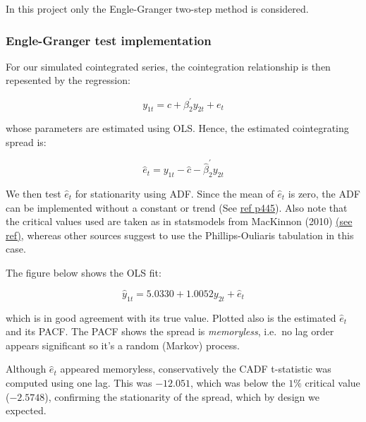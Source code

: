 \documentclass{article}
\begin{document}
In this project only the Engle-Granger two-step method is considered.

    \subsubsection{Engle-Granger test
implementation}\label{engle-granger-test-implementation}

    For our simulated cointegrated series, the cointegration relationship is
then repesented by the regression:

\[
y_{1t} = c + \beta_2^\prime y_{2t} + e_t
\]

whose parameters are estimated using OLS. Hence, the estimated
cointegrating spread is:

\[
\hat{e}_t = y_{1t} - \hat{c} - \hat{\beta}_2^\prime y_{2t}
\]

We then test \(\hat{e}_t\) for stationarity using ADF. Since the mean of
\(\hat{e}_t\) is zero, the ADF can be implemented without a constant or
trend (See
\href{file:///C:/Users/Tanya.Sandoval/Downloads/Cointegration\%20-\%20Book\%20Chapter\%20-\%20UWashington\%20E\%20Zivot.pdf}{ref
p445}). Also note that the critical values used are taken as in
statsmodels from MacKinnon (2010)
\href{http://statsmodels.sourceforge.net/stable/generated/statsmodels.tsa.stattools.adfuller.html\#statsmodels.tsa.stattools.adfuller}{(see
ref)}, whereas other sources suggest to use the Phillips-Ouliaris
tabulation in this case.

The figure below shows the OLS fit:

\[
\hat{y}_{1t} = 5.0330 + 1.0052 y_{2t} + \hat{e}_t
\]

which is in good agreement with its true value. Plotted also is the
estimated \(\hat{e}_t\) and its PACF. The PACF shows the spread is
\emph{memoryless}, i.e.~no lag order appears significant so it's a
random (Markov) process.

Although \(\hat{e}_t\) appeared memoryless, conservatively the CADF
t-statistic was computed using one lag. This was \(-12.051\), which was
below the \(1\%\) critical value (\(-2.5748\)), confirming the
stationarity of the spread, which by design we expected.
\end{document}
